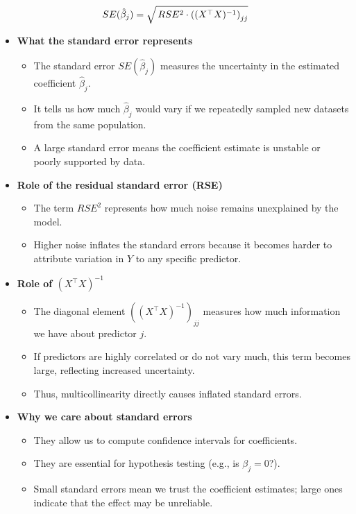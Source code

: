 \documentclass[11pt,a4paper]{article}
\begin{document}
$$
\Large SE(\hat{\beta}_j) = \sqrt{\,RSE^2 \cdot \left( (X^\top X)^{-1} \right)_{jj} }
$$
\begin{itemize}

    \item \textbf{What the standard error represents}  
    \begin{itemize}
        \item The standard error $SE(\hat{\beta}_j)$ measures the uncertainty in the estimated coefficient $\hat{\beta}_j$.  
        \item It tells us how much $\hat{\beta}_j$ would vary if we repeatedly sampled new datasets from the same population.  
        \item A large standard error means the coefficient estimate is unstable or poorly supported by data.
    \end{itemize}

    \item \textbf{Role of the residual standard error (RSE)}  
    \begin{itemize}
        \item The term $RSE^2$ represents how much noise remains unexplained by the model.  
        \item Higher noise inflates the standard errors because it becomes harder to attribute variation in $Y$ to any specific predictor.
    \end{itemize}

    \item \textbf{Role of $(X^\top X)^{-1}$}  
    \begin{itemize}
        \item The diagonal element $\left( (X^\top X)^{-1} \right)_{jj}$ measures how much information we have about predictor $j$.  
        \item If predictors are highly correlated or do not vary much, this term becomes large, reflecting increased uncertainty.  
        \item Thus, multicollinearity directly causes inflated standard errors.
    \end{itemize}

    \item \textbf{Why we care about standard errors}  
    \begin{itemize}
        \item They allow us to compute confidence intervals for coefficients.  
        \item They are essential for hypothesis testing (e.g., is $\beta_j = 0$?).  
        \item Small standard errors mean we trust the coefficient estimates; large ones indicate that the effect may be unreliable.
    \end{itemize}

\end{itemize}
\end{document}
